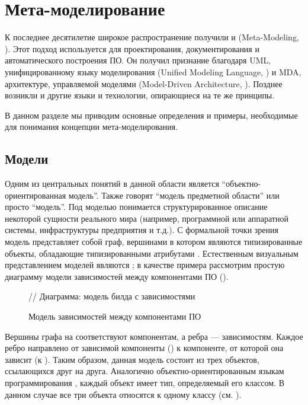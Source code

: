 \chapter{Мета-моделирование}

К последнее десятилетие широкое распространение получили  и  (Meta-Modeling, \cite{MetaModeling}). Этот подход используется для проектирования, документирования и автоматического построения ПО. Он получил признание благодаря UML, унифицированному языку моделирования (Unified Modeling Language, \cite{UML}) и MDA, архитектуре, управляемой моделями (Model-Driven Architecture, \cite{MDA}).
Позднее возникли и другие языки и технологии, опирающиеся на те же принципы.

В данном разделе мы приводим основные определения и примеры, необходимые для понимания концепции мета-моделирования. 

\section{Модели}

Одним из центральных понятий в данной области является ``объектно-ориентированная модель''.  Также говорят ``модель предметной области'' или просто ``модель''. Под моделью понимается структурированное описание некоторой сущности реального мира (например, программной или аппаратной системы, инфраструктуры предприятия и т.д.). С формальной точки зрения модель представляет собой граф, вершинами в котором являются типизированные объекты, обладающие типизированными атрибутами \cite{KM3}. Естественным визуальным представлением моделей являются ; в качестве примера рассмотрим простую диаграмму модели зависимостей между компонентами ПО ().

\begin{figure}[htbp]
// Диаграмма: модель билда с зависимостями
\caption{Модель зависимостей между компонентами ПО}\label{DiagramExample}
\end{figure}

Вершины графа на  соответствуют компонентам, а ребра --- зависимостям. Каждое ребро направлено от зависимой компоненты () к компоненте, от которой она зависит (к ). Таким образом, данная модель состоит из трех объектов, ссылающихся друг на друга. Аналогично объектно-ориентированным языкам программирования \cite{JLS}, каждый объект имеет тип, определяемый его классом. В данном случае все три объекта относятся к одному классу  (см. ). 

